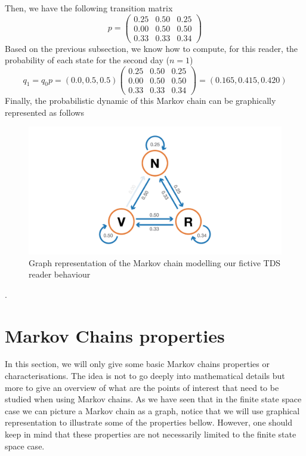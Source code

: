 Then, we have the following transition matrix
\begin{equation}p=\left(\begin{array}{lll}
0.25 & 0.50 & 0.25 \\
0.00 & 0.50 & 0.50 \\
0.33 & 0.33 & 0.34
\end{array}\right)\end{equation}
Based on the previous subsection, we know how to compute, for this reader, the probability of each state for the second day ($n=1$)
\begin{equation}q_{1}=q_{0} p=(0.0,0.5,0.5)\left(\begin{array}{ccc}
0.25 & 0.50 & 0.25 \\
0.00 & 0.50 & 0.50 \\
0.33 & 0.33 & 0.34
\end{array}\right)=(0.165,0.415,0.420)\end{equation}
Finally, the probabilistic dynamic of this Markov chain can be graphically represented as follows

\begin{figure}[h]
    \centering
\includegraphics[width=\textwidth]{pic/p05c07-snip04.png}
    \caption{Graph representation of the Markov chain modelling our fictive TDS reader behaviour}
    \label{fig:p05c07-snip04}
\end{figure}

.

\section{Markov Chains properties}

In this section, we will only give some basic Markov chains properties or characterisations. The idea is not to go deeply into mathematical details but more to give an overview of what are the points of interest that need to be studied when using Markov chains. As we have seen that in the finite state space case we can picture a Markov chain as a graph, notice that we will use graphical representation to illustrate some of the properties bellow. However, one should keep in mind that these properties are not necessarily limited to the finite state space case.

